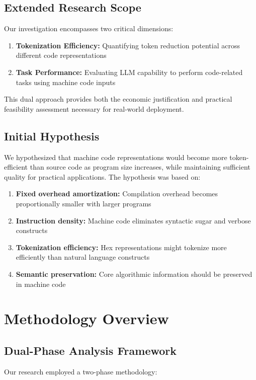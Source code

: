 \documentclass[11pt,a4paper]{article}
\begin{document}
\subsection{Extended Research Scope}
Our investigation encompasses two critical dimensions:

\begin{enumerate}
    \item \textbf{Tokenization Efficiency:} Quantifying token reduction potential across different code representations
    \item \textbf{Task Performance:} Evaluating LLM capability to perform code-related tasks using machine code inputs
\end{enumerate}

This dual approach provides both the economic justification and practical feasibility assessment necessary for real-world deployment.

\subsection{Initial Hypothesis}
We hypothesized that machine code representations would become more token-efficient than source code as program size increases, while maintaining sufficient quality for practical applications. The hypothesis was based on:

\begin{enumerate}
    \item \textbf{Fixed overhead amortization:} Compilation overhead becomes proportionally smaller with larger programs
    \item \textbf{Instruction density:} Machine code eliminates syntactic sugar and verbose constructs
    \item \textbf{Tokenization efficiency:} Hex representations might tokenize more efficiently than natural language constructs
    \item \textbf{Semantic preservation:} Core algorithmic information should be preserved in machine code
\end{enumerate}

\section{Methodology Overview}

\subsection{Dual-Phase Analysis Framework}
Our research employed a two-phase methodology:
\end{document}
